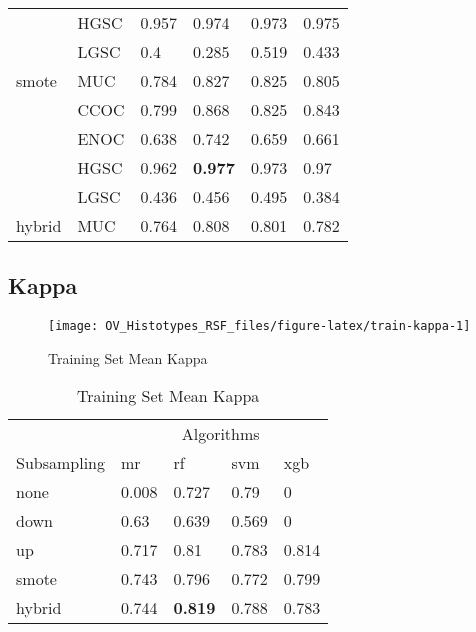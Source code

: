 \documentclass[
]{report}
\begin{document}
\begin{table}
\begin{tabular}[t]{l|l|l|l|l|l}
\cline{2-6}
 & HGSC & 0.957 & 0.974 & 0.973 & 0.975\\
\cline{2-6}
 & LGSC & 0.4 & 0.285 & 0.519 & 0.433\\
\cline{2-6}
\multirow{-5}{*}{\raggedright\arraybackslash smote} & MUC & 0.784 & 0.827 & 0.825 & 0.805\\
\cline{1-6}
 & CCOC & 0.799 & 0.868 & 0.825 & 0.843\\
\cline{2-6}
 & ENOC & 0.638 & 0.742 & 0.659 & 0.661\\
\cline{2-6}
 & HGSC & 0.962 & \textbf{0.977} & 0.973 & 0.97\\
\cline{2-6}
 & LGSC & 0.436 & 0.456 & 0.495 & 0.384\\
\cline{2-6}
\multirow{-5}{*}{\raggedright\arraybackslash hybrid} & MUC & 0.764 & 0.808 & 0.801 & 0.782\\
\hline
\end{tabular}
\end{table}

\hypertarget{kappa}{%
\subsection{Kappa}\label{kappa}}

\begin{figure}[H]

{\centering \texttt{[image: OV\_Histotypes\_RSF\_files/figure-latex/train-kappa-1]} 

}

\caption{Training Set Mean Kappa}\label{fig:train-kappa}
\end{figure}

\begin{table}

\caption{\label{tab:train-kappa-table}Training Set Mean Kappa}
\centering
\begin{tabular}[t]{l|l|l|l|l}
\hline
\multicolumn{1}{c|}{ } & \multicolumn{4}{c}{Algorithms} \\
\cline{2-5}
Subsampling & mr & rf & svm & xgb\\
\hline
none & 0.008 & 0.727 & 0.79 & 0\\
\hline
down & 0.63 & 0.639 & 0.569 & 0\\
\hline
up & 0.717 & 0.81 & 0.783 & 0.814\\
\hline
smote & 0.743 & 0.796 & 0.772 & 0.799\\
\hline
hybrid & 0.744 & \textbf{0.819} & 0.788 & 0.783\\
\hline
\end{tabular}
\end{table}
\end{document}
